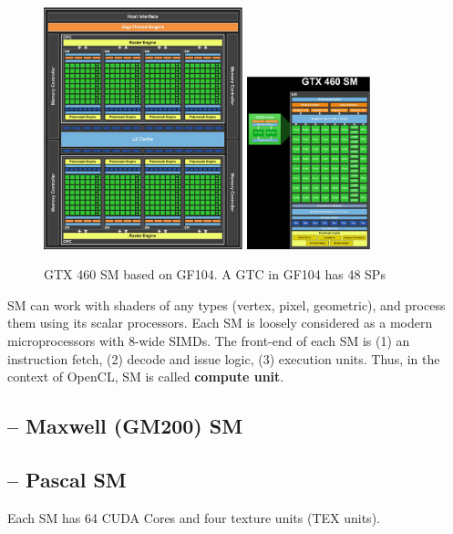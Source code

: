 \begin{figure}[hbt]
\centerline{\includegraphics[height=7cm,angle=0]{./images/GF104.eps}
\includegraphics[height=5cm,angle=0]{./images/GF104_SM.eps}}
\caption{GTX 460 SM based on GF104. A GTC in GF104 has 48 SPs}
\label{fig:GF104}
\end{figure}

\begin{framed}
  SM can work with shaders of any types (vertex, pixel, geometric),
  and process them using its scalar processors.  Each SM is loosely
  considered as a modern microprocessors with 8-wide SIMDs. The
  front-end of each SM is (1) an instruction fetch, (2) decode and
  issue logic, (3) execution units. Thus, in the context of OpenCL, SM
  is called {\bf compute unit}.
\end{framed}

\subsection{-- Maxwell (GM200) SM}
\label{sec:SM-Maxwell}


\subsection{-- Pascal SM}
\label{sec:SM-Pascal}

Each SM has 64 CUDA Cores and four texture units (TEX units).


